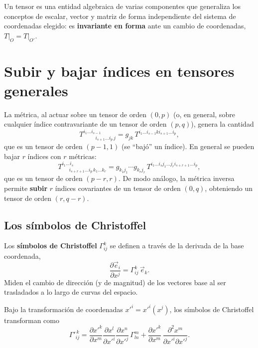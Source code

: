 \begin{observacion}
Un tensor es una entidad algebraica de varias componentes que generaliza
los conceptos de escalar, vector y matriz de forma independiente del
sistema de coordenadas elegido: es \textbf{invariante en forma} ante un
cambio de coordenadas, $T\big|_O = T\big|_{O'}$.
\end{observacion}

\section{Subir y bajar índices en tensores generales}

La métrica, al actuar sobre un tensor de orden $(0,p)$ (o, en general,
sobre cualquier índice contravariante de un tensor de orden $(p,q)$),
genera la cantidad
\[
T^{i_1\dots i_{s-1}}_{\quad\quad\ \ i_{s+1}\dots i_p\, j} = g_{jk}\,
T^{i_1\dots i_{s-1}k i_{s+1}\dots i_p},
\]
que es un tensor de orden $(p-1,1)$ (se ``bajó'' un índice). En general
se pueden bajar $r$ índices con $r$ métricas:
\[
T^{i_1\dots i_s}_{\quad\ \ i_{s+r+1}\dots i_p\, k_1\dots k_r} =
g_{k_1j_1}\cdots g_{k_rj_r}\, T^{i_1\dots i_s j_1\dots j_r
i_{s+r+1}\dots i_p},
\]
que es un tensor de orden $(p-r,r)$. De modo análogo, la métrica inversa
permite \textbf{subir} $r$ índices covariantes de un tensor de orden
$(0,q)$, obteniendo un tensor de orden $(r,q-r)$.

\subsection{Los símbolos de Christoffel}

\begin{definicion}
Los \textbf{símbolos de Christoffel} $\Gamma^k_{ij}$ se definen a
través de la derivada de la base coordenada,
\[
\frac{\partial \vec e_i}{\partial x^j} = \Gamma^k_{ij}\, \vec e_k .
\]
Miden el cambio de dirección (y de magnitud) de los vectores base al ser
trasladados a lo largo de curvas del espacio.
\end{definicion}

\begin{proposicionc}
Bajo la transformación de coordenadas $x'^i=x'^i(x^j)$, los símbolos de
Christoffel transforman como
\[
\Gamma'^{\,k}_{ij} = \frac{\partial x'^k}{\partial x^m}\frac{\partial
x^l}{\partial x'^i}\frac{\partial x^n}{\partial x'^j}\, \Gamma^m_{ln} +
\frac{\partial x'^k}{\partial x^m}\, \frac{\partial^2 x^m}{\partial
x'^i\partial x'^j} .
\]
\end{proposicionc}

